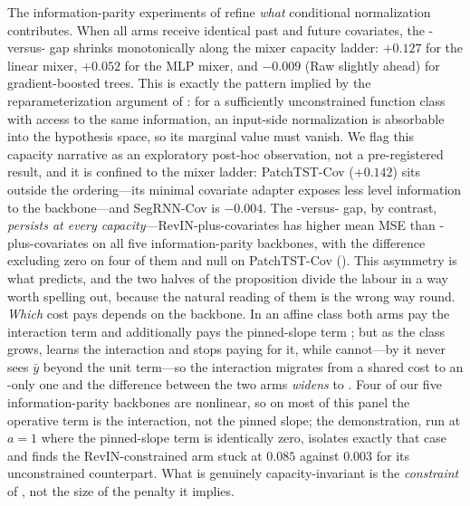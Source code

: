 The information-parity experiments of  refine \emph{what} conditional normalization contributes. When all arms receive identical past and future covariates, the \rawm-versus-\cnm{} gap shrinks monotonically along the mixer capacity ladder: $+0.127$ for the linear mixer, $+0.052$ for the MLP mixer, and $-0.009$ (Raw slightly ahead) for gradient-boosted trees. This is exactly the pattern implied by the reparameterization argument of \citet{toner2024linear}: for a sufficiently unconstrained function class with access to the same information, an input-side normalization is absorbable into the hypothesis space, so its marginal value must vanish. We flag this capacity narrative as an exploratory post-hoc observation, not a pre-registered result, and it is confined to the mixer ladder: PatchTST-Cov ($+0.142$) sits outside the ordering---its minimal covariate adapter exposes less level information to the backbone---and SegRNN-Cov is $-0.004$. The \inm-versus-\cnm{} gap, by contrast, \emph{persists at every capacity}---RevIN-plus-covariates has higher mean MSE than \rawm-plus-covariates on all five information-parity backbones, with the difference excluding zero on four of them and null on PatchTST-Cov (). This asymmetry is what  predicts, and the two halves of the proposition divide the labour in a way worth spelling out, because the natural reading of them is the wrong way round. \emph{Which} cost \inm{} pays depends on the backbone. In an affine class both arms pay the interaction term  and \inm{} additionally pays the pinned-slope term ; but as the class grows, \rawm{} learns the interaction and stops paying for it, while \inm{} cannot---by  it never sees $\bar y$ beyond the unit term---so the interaction migrates from a shared cost to an \inm-only one and the difference between the two arms \emph{widens} to . Four of our five information-parity backbones are nonlinear, so on most of this panel the operative term is the interaction, not the pinned slope; the  demonstration, run at $a=1$ where the pinned-slope term is identically zero, isolates exactly that case and finds the RevIN-constrained arm stuck at $0.085$ against $0.003$ for its unconstrained counterpart. What is genuinely capacity-invariant is the \emph{constraint} of , not the size of the penalty it implies.

